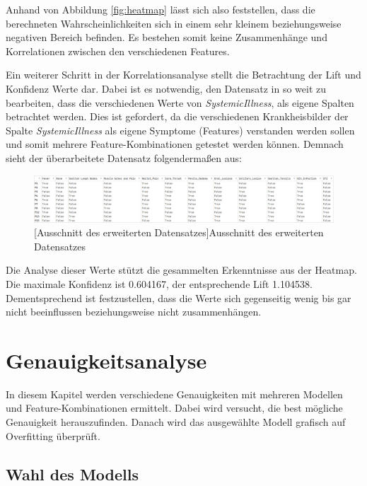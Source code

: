 \documentclass[13pt,a4paper, listof=entryprefix, bibliography=totocnumbered,toc=listofnumbered,lof=listofnumbered]{scrartcl}
\begin{document}
Anhand von Abbildung \ref{fig:heatmap} lässt sich also feststellen, dass die berechneten Wahrscheinlichkeiten sich in einem sehr kleinem beziehungsweise 
negativen Bereich befinden. Es bestehen somit keine Zusammenhänge und Korrelationen zwischen den verschiedenen Features. 

Ein weiterer Schritt in der Korrelationsanalyse stellt die Betrachtung der Lift und Konfidenz Werte dar. Dabei ist es notwendig, den 
Datensatz in so weit zu bearbeiten, dass die verschiedenen Werte von \textit{Systemic\textunderscore Illness}, als eigene Spalten betrachtet werden. 
Dies ist gefordert, da die verschiedenen Krankheisbilder der Spalte \textit{Systemic\textunderscore Illness} als eigene Symptome (Features) verstanden werden sollen und somit mehrere Feature-Kombinationen 
getestet werden können. Demnach sieht der überarbeitete Datensatz folgendermaßen aus: 

	\begin{figure}[H]
		\centering
		\includegraphics[width=0.8\linewidth]{Bilder/tranp_df.png}
		[Ausschnitt des erweiterten Datensatzes]{Ausschnitt des erweiterten Datensatzes}
		\label{fig:transp_feature}
	\end{figure}

Die Analyse dieser Werte stützt die gesammelten Erkenntnisse aus der Heatmap. Die maximale Konfidenz ist 0.604167, der entsprechende Lift
1.104538. Dementsprechend ist festzustellen, dass die Werte sich gegenseitig wenig bis gar nicht beeinflussen beziehungsweise nicht zusammenhängen. 


	\section{Genauigkeitsanalyse}
		\label{ch:genauigkeit_analyse}

In diesem Kapitel werden verschiedene Genauigkeiten mit mehreren Modellen und Feature-Kombinationen ermittelt. Dabei wird versucht, die best mögliche Genauigkeit herauszufinden. 
Danach wird das ausgewählte Modell grafisch auf Overfitting überprüft.  

	\subsection{Wahl des Modells}
		\label{ch:wahl_modell}
\end{document}
